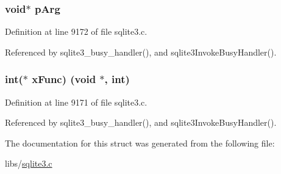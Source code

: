 \subsubsection[{p\+Arg}]{\setlength{\rightskip}{0pt plus 5cm}void$\ast$ p\+Arg}\label{struct_busy_handler_a5a7d47e76f80bf2a08cba5fe83b61d2a}


Definition at line 9172 of file sqlite3.\+c.



Referenced by sqlite3\+\_\+busy\+\_\+handler(), and sqlite3\+Invoke\+Busy\+Handler().

\hypertarget{struct_busy_handler_a7e6c9383b6894eb86ebaa85cdaa4c5fc}{}
\subsubsection[{x\+Func}]{\setlength{\rightskip}{0pt plus 5cm}int($\ast$ x\+Func) (void $\ast$, int)}\label{struct_busy_handler_a7e6c9383b6894eb86ebaa85cdaa4c5fc}


Definition at line 9171 of file sqlite3.\+c.



Referenced by sqlite3\+\_\+busy\+\_\+handler(), and sqlite3\+Invoke\+Busy\+Handler().



The documentation for this struct was generated from the following file\+:\begin{DoxyCompactItemize}
\item 
libs/\hyperlink{sqlite3_8c}{sqlite3.\+c}\end{DoxyCompactItemize}
